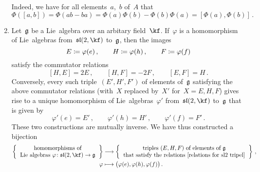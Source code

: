 \begin{examples}
\begin{enumerate}
			Indeed, we have for all elements~$a$,~$b$ of~$A$ that
			\[
				\Phi([a,b])
				=
				\Phi(ab - ba)
				=
				\Phi(a) \Phi(b) - \Phi(b) \Phi(a)
				=
				[\Phi(a), \Phi(b)] \,.
			\]
		\item
			Let~$\mathfrak{g}$ be a Lie~algebra over an arbitary field~$\kf$.
			If~$\varphi$ is a homomorphism of Lie~algebras from~$\sllie(2, \kf)$ to~$\mathfrak{g}$, then the images
			\[
				E \coloneqq \varphi(e)  \,,
				\qquad
				H \coloneqq \varphi(h)  \,,
				\qquad
				F \coloneqq \varphi(f)
			\]
			satisfy the commutator relations
			\begin{equation}
				\label{relations for sl2 tripel}
				[H, E] = 2E  \,,
				\qquad
				[H, F] = -2F  \,,
				\qquad
				[E, F] = H \,.
			\end{equation}
			Conversely, every such triple~$(E', H', F')$ of elements of~$\mathfrak{g}$ satisfying the above commutator relations (with~$X$ replaced by~$X'$ for~$X = E, H, F$) gives rise to a unique homomorphism of Lie~algebras~$\varphi'$ from~$\sllie(2, \kf)$ to~$\mathfrak{g}$ that is given by
			\[
				\varphi'(e) = E' \,,
				\qquad
				\varphi'(h) = H' \,,
				\qquad
				\varphi'(f) = F' \,.
			\] 
			These two constructions are mutually inverse.
			We have thus constructed a bijection
			\begin{align*}
				\left\{
					\begin{tabular}{c}
						homomorphisms of \\
						Lie~algebras~$\varphi \colon \sllie(2, \kf) \to \glie$
					\end{tabular}
				\right\}
				&\to
				\left\{
					\begin{tabular}{c}
						triples $(E, H, F)$ of elements of~$\glie$ \\
						that satisfy the relations~\eqref{relations for sl2 tripel}
					\end{tabular}
				\right\} \,,
				\\
				\varphi
				&\mapsto
				\bigl( \varphi(e), \varphi(h), \varphi(f) \bigr) \,.
			\end{align*}
	\end{enumerate}
\end{examples}


